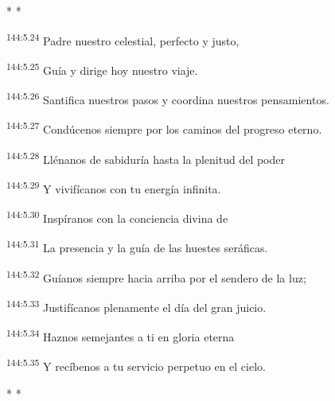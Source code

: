 \begin{center}
	\par* * *
\end{center}

\begin{center}
\par
\textsuperscript{144:5.24} Padre nuestro celestial, perfecto y justo,

\par
\textsuperscript{144:5.25} Guía y dirige hoy nuestro viaje.

\par
\textsuperscript{144:5.26} Santifica nuestros pasos y coordina nuestros pensamientos.

\par
\textsuperscript{144:5.27} Condúcenos siempre por los caminos del progreso eterno.

\par
\textsuperscript{144:5.28} Llénanos de sabiduría hasta la plenitud del poder

\par
\textsuperscript{144:5.29} Y vivifícanos con tu energía infinita.

\par
\textsuperscript{144:5.30} Inspíranos con la conciencia divina de

\par
\textsuperscript{144:5.31} La presencia y la guía de las huestes seráficas.

\par
\textsuperscript{144:5.32} Guíanos siempre hacia arriba por el sendero de la luz;

\par
\textsuperscript{144:5.33} Justifícanos plenamente el día del gran juicio.

\par
\textsuperscript{144:5.34} Haznos semejantes a ti en gloria eterna

\par
\textsuperscript{144:5.35} Y recíbenos a tu servicio perpetuo en el cielo.
\end{center}

\begin{center}
	\par* * *
\end{center}

